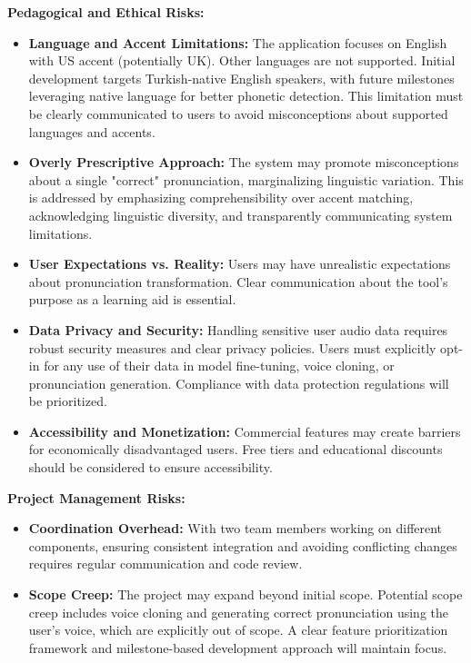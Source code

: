 \documentclass[a4paper,12pt]{report}
\begin{document}
\textbf{Pedagogical and Ethical Risks:}
\begin{itemize}
    \item \textbf{Language and Accent Limitations:} The application focuses on English with US accent (potentially UK). Other languages are not supported. Initial development targets Turkish-native English speakers, with future milestones leveraging native language for better phonetic detection. This limitation must be clearly communicated to users to avoid misconceptions about supported languages and accents.
    \item \textbf{Overly Prescriptive Approach:} The system may promote misconceptions about a single "correct" pronunciation, marginalizing linguistic variation. This is addressed by emphasizing comprehensibility over accent matching, acknowledging linguistic diversity, and transparently communicating system limitations.
    \item \textbf{User Expectations vs. Reality:} Users may have unrealistic expectations about pronunciation transformation. Clear communication about the tool's purpose as a learning aid is essential.
    \item \textbf{Data Privacy and Security:} Handling sensitive user audio data requires robust security measures and clear privacy policies. Users must explicitly opt-in for any use of their data in model fine-tuning, voice cloning, or pronunciation generation. Compliance with data protection regulations will be prioritized.
    \item \textbf{Accessibility and Monetization:} Commercial features may create barriers for economically disadvantaged users. Free tiers and educational discounts should be considered to ensure accessibility.
\end{itemize}

\textbf{Project Management Risks:}
\begin{itemize}
    \item \textbf{Coordination Overhead:} With two team members working on different components, ensuring consistent integration and avoiding conflicting changes requires regular communication and code review.
    \item \textbf{Scope Creep:} The project may expand beyond initial scope. Potential scope creep includes voice cloning and generating correct pronunciation using the user's voice, which are explicitly out of scope. A clear feature prioritization framework and milestone-based development approach will maintain focus.
\end{itemize}
\end{document}
